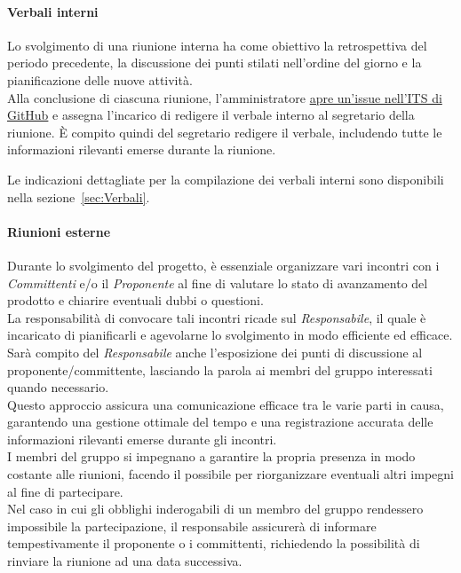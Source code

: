 \hypertarget{par:verbaliInterni}{\paragraph*{Verbali interni}}
Lo svolgimento di una riunione interna ha come obiettivo la retrospettiva del periodo precedente, la discussione dei punti stilati nell'ordine del giorno e la pianificazione delle nuove attività. \\
Alla conclusione di ciascuna riunione, l'amministratore \hyperlink{par:ticketing}{apre un'issue nell'ITS di GitHub} e assegna l'incarico di redigere il verbale interno al segretario della riunione. È compito quindi del segretario redigere il verbale, includendo tutte le informazioni rilevanti emerse durante la riunione.

Le indicazioni dettagliate per la compilazione dei verbali interni sono disponibili nella sezione~\ref{sec:Verbali}.

\paragraph{Riunioni esterne}
Durante lo svolgimento del progetto, è essenziale organizzare vari incontri con i \textit{Committenti} e/o il \textit{Proponente} al fine di valutare lo stato di avanzamento del prodotto e chiarire eventuali dubbi o questioni. \\
La responsabilità di convocare tali incontri ricade sul \textit{Responsabile}, il quale è incaricato di pianificarli e agevolarne lo svolgimento in modo efficiente ed efficace. \\
Sarà compito del \textit{Responsabile} anche l'esposizione dei punti di discussione al proponente/committente, lasciando la parola ai membri del gruppo interessati quando necessario. \\
Questo approccio assicura una comunicazione efficace tra le varie parti in causa, garantendo una gestione ottimale del tempo e una registrazione accurata delle informazioni rilevanti emerse durante gli incontri.\\
I membri del gruppo si impegnano a garantire la propria presenza in modo costante alle riunioni, facendo il possibile per riorganizzare eventuali altri impegni al fine di partecipare. \\
Nel caso in cui gli obblighi inderogabili di un membro del gruppo rendessero impossibile la partecipazione, il responsabile assicurerà di informare tempestivamente il proponente o i committenti, richiedendo la possibilità di rinviare la riunione ad una data successiva.

